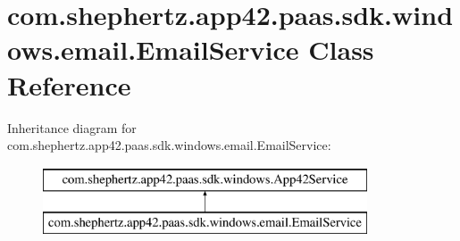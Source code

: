 \hypertarget{classcom_1_1shephertz_1_1app42_1_1paas_1_1sdk_1_1windows_1_1email_1_1_email_service}{\section{com.\+shephertz.\+app42.\+paas.\+sdk.\+windows.\+email.\+Email\+Service Class Reference}
\label{classcom_1_1shephertz_1_1app42_1_1paas_1_1sdk_1_1windows_1_1email_1_1_email_service}
}
Inheritance diagram for com.\+shephertz.\+app42.\+paas.\+sdk.\+windows.\+email.\+Email\+Service\+:\begin{figure}[H]
\begin{center}
\leavevmode
\includegraphics[height=2.000000cm]{classcom_1_1shephertz_1_1app42_1_1paas_1_1sdk_1_1windows_1_1email_1_1_email_service}
\end{center}
\end{figure}

